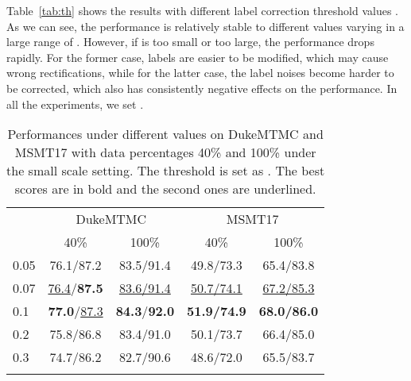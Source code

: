 \documentclass[10pt,twocolumn,letterpaper]{article}
\begin{document}
Table~\ref{tab:th} shows the results with different label correction threshold values . As we can see, the performance is relatively stable to different  values varying in a large range of . However, if  is too small or too large, the performance drops rapidly. For the former case, labels are easier to be modified, which may cause wrong rectifications, while for the latter case, the label noises become harder to be corrected, which also has consistently negative effects on the performance. In all the experiments, we set .

\begin{table}[t]
	\setlength{\tabcolsep}{2.5mm}
	\begin{tabular}{l|c|c|c|c}
		\shline
		\multirow{2}{*}{} & \multicolumn{2}{c|}{DukeMTMC} & \multicolumn{2}{c}{MSMT17} \\ 
		\cline{2-5} & 40\% & 100\% & 40\% & 100\% \\ 
		\hline 
		0.05 & 76.1/87.2 & 83.5/91.4 & 49.8/73.3 & 65.4/83.8 \\
		0.07 & \underline{76.4}/\textbf{87.5} & \underline{83.6/91.4} & \underline{50.7/74.1} & \underline{67.2/85.3} \\
		0.1  & \textbf{77.0}/\underline{87.3} & \textbf{84.3}/\textbf{92.0} & \textbf{51.9/74.9} & \textbf{68.0/86.0} \\
		0.2  & 75.8/86.8 & 83.4/91.0 & 50.1/73.7 & 66.4/85.0 \\
		0.3  & 74.7/86.2 & 82.7/90.6 & 48.6/72.0 & 65.5/83.7 \\
		\shline
	\end{tabular}
	\caption{Performances under different  values on DukeMTMC and MSMT17 with data percentages 40\% and 100\% under the small scale setting. The threshold is set as . The best scores are in bold and the second ones are underlined.}
	\label{tab:tau}
\end{table}
\end{document}
